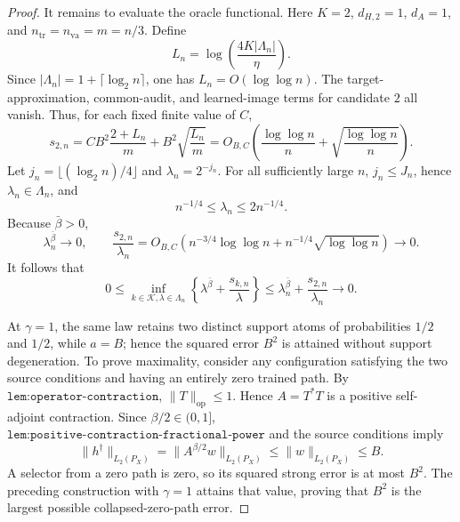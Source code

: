 \begin{proof}
It remains to evaluate the oracle functional. Here \(K=2\), \(d_{H,2}=1\), \(d_A=1\), and \(n_{\mathrm{tr}}=n_{\mathrm{va}}=m=n/3\). Define
\[
 L_n=\log\!\left(\frac{4K|\Lambda_n|}{\eta}\right).
\]
Since \(|\Lambda_n|=1+\lceil\log_2 n\rceil\), one has \(L_n=O(\log\log n)\). The target-approximation, common-audit, and learned-image terms for candidate \(2\) all vanish. Thus, for each fixed finite value of \(C\),
\[
 s_{2,n}
 =CB^2\frac{2+L_n}{m}
  +B^2\sqrt{\frac{L_n}{m}}
 =O_{B,C}\!\left(\frac{\log\log n}{n}
   +\sqrt{\frac{\log\log n}{n}}\right).
\]
Let \(j_n=\lfloor(\log_2 n)/4\rfloor\) and \(\lambda_n=2^{-j_n}\). For all sufficiently large \(n\), \(j_n\le J_n\), hence \(\lambda_n\in\Lambda_n\), and
\[
 n^{-1/4}\le\lambda_n\le2n^{-1/4}.
\]
Because \(\bar\beta>0\),
\[
 \lambda_n^{\bar\beta}\longrightarrow0,
 \qquad
 \frac{s_{2,n}}{\lambda_n}
 =O_{B,C}\!\left(n^{-3/4}\log\log n
   +n^{-1/4}\sqrt{\log\log n}\right)
 \longrightarrow0.
\]
It follows that
\[
 0\le
 \inf_{k\in\mathcal K,\lambda\in\Lambda_n}
 \left\{\lambda^{\bar\beta}+\frac{s_{k,n}}{\lambda}\right\}
 \le \lambda_n^{\bar\beta}+\frac{s_{2,n}}{\lambda_n}
 \longrightarrow0.
\]

At \(\gamma=1\), the same law retains two distinct support atoms of probabilities \(1/2\) and \(1/2\), while \(a=B\); hence the squared error \(B^2\) is attained without support degeneration. To prove maximality, consider any configuration satisfying the two source conditions and having an entirely zero trained path. By \(\texttt{lem:operator-contraction}\), \(\|T\|_{\mathrm{op}}\le1\). Hence \(A=T^*T\) is a positive self-adjoint contraction. Since \(\beta/2\in(0,1]\), \(\texttt{lem:positive-contraction-fractional-power}\) and the source conditions imply
\[
 \|h^\dagger\|_{L_2(P_X)}
 =\|A^{\beta/2}w\|_{L_2(P_X)}
 \le\|w\|_{L_2(P_X)}
 \le B.
\]
A selector from a zero path is zero, so its squared strong error is at most \(B^2\). The preceding construction with \(\gamma=1\) attains that value, proving that \(B^2\) is the largest possible collapsed-zero-path error.
\end{proof}